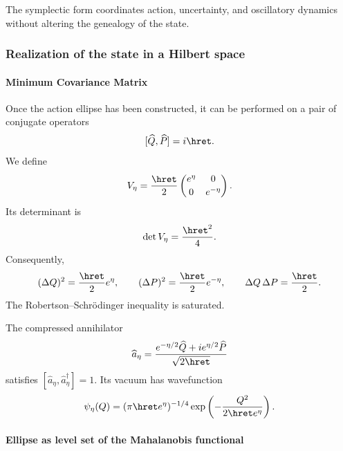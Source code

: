 \noindent The symplectic form coordinates action, uncertainty, and oscillatory dynamics without altering the genealogy of the state.\par\medskip

\subsubsection{Realization of the state in a Hilbert space}

\paragraph{Minimum Covariance Matrix}

Once the action ellipse has been constructed, it can be performed on a pair of
conjugate operators
\[
[\widehat Q,\widehat P]=i\hret.
\]
We define
\begin{equation}
V_\eta=\frac{\hret}{2}
\begin{pmatrix}
e^\eta&0\\[2pt]0&e^{-\eta}
\end{pmatrix}.
\label{eq:covariance}
\end{equation}
Its determinant is
\begin{equation}
\det V_\eta=\frac{\hret^2}{4}.
\label{eq:cov-det}
\end{equation}
Consequently,
\begin{equation}
(\Delta Q)^2=\frac{\hret}{2}e^\eta,
\qquad
(\Delta P)^2=\frac{\hret}{2}e^{-\eta},
\qquad
\Delta Q\,\Delta P=\frac{\hret}{2}.
\label{eq:uncertainty}
\end{equation}
The Robertson--Schrödinger inequality is saturated.

The compressed annihilator
\begin{equation}
\widehat a_\eta=
\frac{e^{-\eta/2}\widehat Q+i e^{\eta/2}\widehat P}
{\sqrt{2\hret}}
\label{eq:a-eta}
\end{equation}
satisfies \([\widehat a_\eta,\widehat a_\eta^\dagger]=1\). Its vacuum has
wavefunction
\begin{equation}
\psi_\eta(Q)=
(\pi\hret e^\eta)^{-1/4}
\exp\left(-\frac{Q^2}{2\hret e^\eta}\right).
\label{eq:gaussian}
\end{equation}

\paragraph{Ellipse as level set of the Mahalanobis functional}

